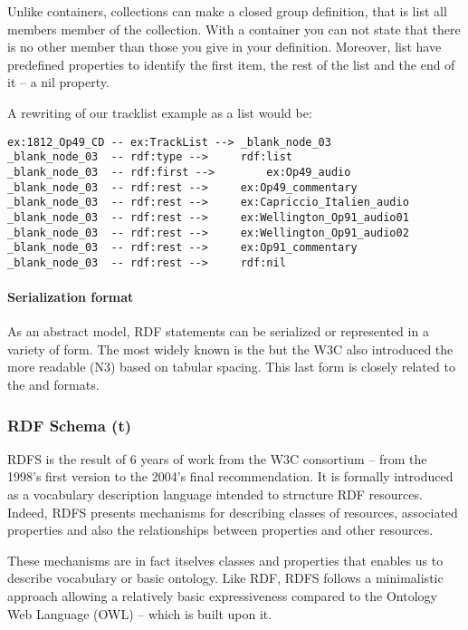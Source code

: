 Unlike containers, collections can make a closed group definition, that is list all members member of the collection. With a container you can not state that there  is no other member than those you give in your definition. 
Moreover, list have predefined properties to identify the first item, the rest of the list and the end of it – a nil property. 

A rewriting of our tracklist example as a list would be:
\begin{Verbatim}[fontsize=\small,formatcom=\color{black!70}]
ex:1812_Op49_CD	-- ex:TrackList -->	_blank_node_03
_blank_node_03	-- rdf:type -->		rdf:list
_blank_node_03	-- rdf:first -->		ex:Op49_audio
_blank_node_03	-- rdf:rest -->		ex:Op49_commentary
_blank_node_03	-- rdf:rest -->		ex:Capriccio_Italien_audio
_blank_node_03	-- rdf:rest -->		ex:Wellington_Op91_audio01
_blank_node_03	-- rdf:rest -->		ex:Wellington_Op91_audio02
_blank_node_03	-- rdf:rest -->		ex:Op91_commentary
_blank_node_03	-- rdf:rest -->		rdf:nil
\end{Verbatim}

\paragraph{Serialization format}
As an abstract model, RDF statements can be serialized or represented in a variety of form. The most widely known is the  but the W3C also introduced the more readable  (N3) based on tabular spacing. This last form is closely related to the  and  formats.





\subsubsection{RDF Schema (t)}
RDFS is the result of 6 years of work from the W3C consortium – from the 1998's first version to the 2004's final recommendation. 
It is formally introduced as a vocabulary description language intended to structure RDF resources. 
Indeed, RDFS presents mechanisms for describing classes of resources, associated properties and also the relationships between properties and other resources. 

These mechanisms are in fact itselves classes and properties that enables us to describe vocabulary or basic ontology. 
Like RDF, RDFS follows a minimalistic approach allowing a relatively basic expressiveness compared to the Ontology Web Language (OWL) – which is built upon it.

